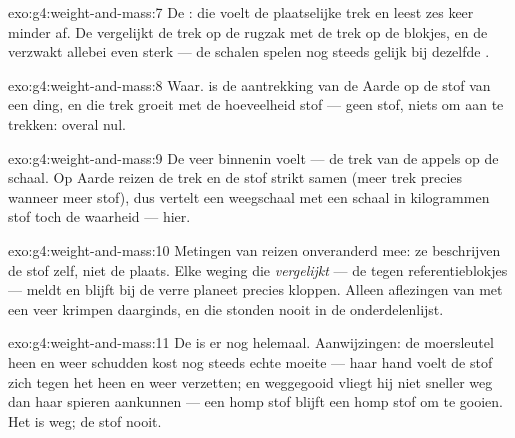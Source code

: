 \begin{solution}{exo:g4:weight-and-mass:7}
De : die voelt de plaatselijke trek en leest zes keer
minder af. De  vergelijkt de trek op de rugzak met de
trek op de blokjes, en de  verzwakt allebei even sterk --- de
schalen spelen nog steeds gelijk bij dezelfde .
\end{solution}

\begin{solution}{exo:g4:weight-and-mass:8}
Waar.  is de aantrekking van de Aarde op de stof van een ding,
en die trek groeit met de hoeveelheid stof --- geen stof, niets om aan
te trekken: overal  nul.
\end{solution}

\begin{solution}{exo:g4:weight-and-mass:9}
De veer binnenin voelt \emph{} --- de trek van de appels op de
schaal. Op Aarde reizen de trek en de stof strikt samen (meer trek
precies wanneer meer stof), dus vertelt een weegschaal met een schaal
in kilogrammen stof toch de waarheid --- hier.
\end{solution}

\begin{solution}{exo:g4:weight-and-mass:10}
Metingen van  reizen onveranderd mee: ze beschrijven de stof zelf,
niet de plaats. Elke weging die \emph{vergelijkt} --- de
 tegen referentieblokjes --- meldt  en blijft
bij de verre planeet precies kloppen. Alleen aflezingen van
 met een veer krimpen daarginds, en die stonden nooit in de
onderdelenlijst.
\end{solution}

\begin{solution}{exo:g4:weight-and-mass:11}
De  is er nog helemaal. Aanwijzingen: de moersleutel heen en
weer schudden kost nog steeds echte moeite --- haar hand voelt de stof
zich tegen het heen en weer verzetten; en weggegooid vliegt hij niet
sneller weg dan haar spieren aankunnen --- een homp stof blijft een
homp stof om te gooien. Het  is weg; de stof nooit.
\end{solution}
